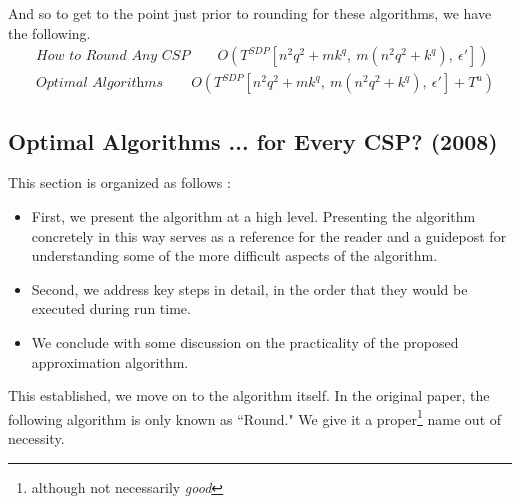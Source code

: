And so to get to the point just prior to rounding for these algorithms, we have the following.
\begin{align}
&\textit{How to Round Any CSP} \qquad O( T^{SDP}\left[n^2q^2 + mk^q,~ m (n^2q^2 + k^q),~\epsilon'\right])  \\
&\textit{Optimal Algorithms} \qquad O( T^{SDP}\left[n^2q^2 + mk^q,~ m (n^2q^2 + k^q),~\epsilon'\right] + T^u)
\end{align} 


\subsection{Optimal Algorithms ... for Every CSP? (2008)}
This section is organized as follows :
\begin{itemize}
\item First, we present the algorithm at a high level. Presenting the algorithm concretely in this way serves as a reference for the reader and a guidepost for understanding some of the more difficult aspects of the algorithm.
\item Second, we address key steps in detail, in the order that they would be executed during run time.
\item We conclude with some discussion on the practicality of the proposed approximation algorithm.
\end{itemize}

This established, we move on to the algorithm itself. In the original paper, the following algorithm is only known as ``Round." We give it a proper\footnote{although not necessarily \textit{good}} name out of necessity.

